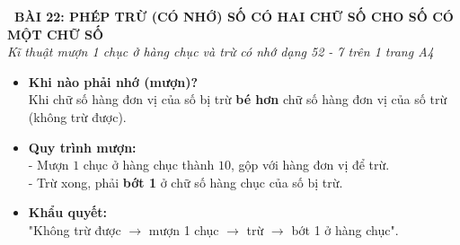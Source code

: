 \documentclass[11pt,a4paper]{article}
\begin{document}
\begin{tcolorbox}[
  enhanced,
  colback=violet!8!white,
  colframe=violet!70!black,
  arc=3mm, boxrule=1.2pt,
  left=3mm, right=3mm, top=2mm, bottom=2mm,
  halign=center
]
  {\LARGE\bfseries\color{violet!90!black}\faBookmark\ BÀI 22: PHÉP TRỪ (CÓ NHỚ) SỐ CÓ HAI CHỮ SỐ CHO SỐ CÓ MỘT CHỮ SỐ}\\[1mm]
  {\itshape\footnotesize\color{black!75} Kĩ thuật mượn 1 chục ở hàng chục và trừ có nhớ dạng 52 - 7 trên 1 trang A4}
\end{tcolorbox}

\vspace{-2mm}

\noindent
\begin{minipage}[t]{0.49\textwidth}\vspace{0pt}
\begin{tcolorbox}[
  enhanced,
  colback=violet!4!white,
  colframe=violet!75!black,
  arc=2mm, boxrule=0.8pt,
  left=2mm, right=2mm, top=1.8mm, bottom=1.8mm,
  title={\footnotesize\bfseries\color{white}\faKey\ 1. Quy tắc mượn 1 chục}
]
{\footnotesize
\begin{itemize}\setlength{\itemsep}{1pt}\setlength{\leftskip}{-2.5mm}
  \item \textbf{Khi nào phải nhớ (mượn)?}\\
  Khi chữ số hàng đơn vị của số bị trừ \textbf{bé hơn} chữ số hàng đơn vị của số trừ (không trừ được).
  \item \textbf{Quy trình mượn:}\\
  - Mượn $1$ chục ở hàng chục thành $10$, gộp với hàng đơn vị để trừ.\\
  - Trừ xong, phải \textbf{bớt 1} ở chữ số hàng chục của số bị trừ.
  \item \textbf{Khẩu quyết:}\\
  "Không trừ được $\to$ mượn 1 chục $\to$ trừ $\to$ bớt 1 ở hàng chục".
\end{itemize}
}
\end{tcolorbox}
\end{minipage}
\hfill
\end{document}
